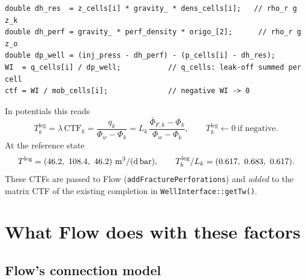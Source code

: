 \documentclass[11pt,a4paper]{article}
\newcommand{\Phiw}{\Phi_w}
\newcommand{\cond}{\si{m^3/(d\,bar)}}
\begin{document}
\begin{lstlisting}
double dh_res  = z_cells[i] * gravity_ * dens_cells[i];   // rho_r g z_k
double dh_perf = gravity_ * perf_density * origo_[2];      // rho_r g z_o
double dp_well = (inj_press - dh_perf) - (p_cells[i] - dh_res);
WI  = q_cells[i] / dp_well;           // q_cells: leak-off summed per cell
ctf = WI / mob_cells[i];              // negative WI -> 0
\end{lstlisting}
In potentials this reads
\begin{equation}
  T_k^{\text{leg}}=\lambda\,\mathrm{CTF}_k=\frac{q_k}{\Phiw-\Phi_k}
  =L_k\,\frac{\bar\Phi_{F,k}-\Phi_k}{\Phiw-\Phi_k},
  \qquad T_k^{\text{leg}}\leftarrow 0\ \text{if negative.}
  \label{eq:legacy}
\end{equation}
At the reference state
\[
  T^{\text{leg}}=(\Ttop,\ \Tmid,\ \Tbot)\ \text{\cond},\qquad
  T^{\text{leg}}_k/L_k=(\TLtop,\ \TLmid,\ \TLbot).
\]
These CTFs are passed to Flow (\texttt{addFracturePerforations}) and \emph{added} to the matrix
CTF of the existing completion in \texttt{WellInterface::getTw()}.

\section{What Flow does with these factors}

\subsection{Flow's connection model}
\end{document}
